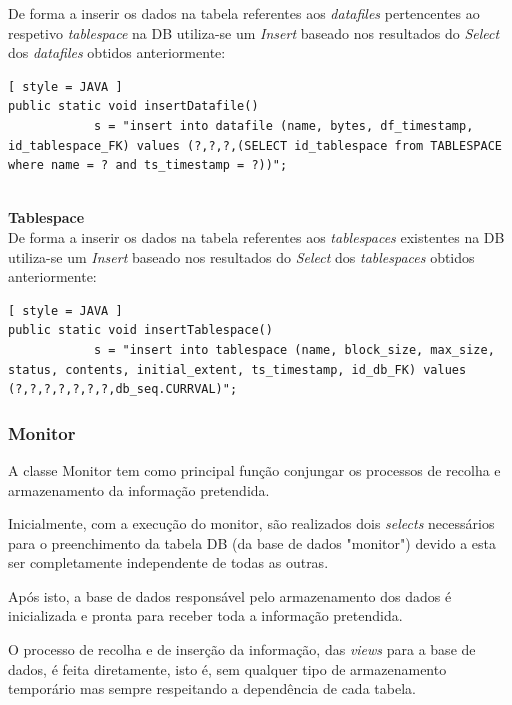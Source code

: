 \documentclass[a4paper]{article}
\begin{document}
De forma a inserir os dados na tabela referentes aos \emph{datafiles} pertencentes ao respetivo \emph{tablespace} na DB utiliza-se um \emph{Insert} baseado nos resultados do \emph{Select} dos \emph{datafiles} obtidos anteriormente:

\begin{lstlisting}[ style = JAVA ]
public static void insertDatafile() 
            s = "insert into datafile (name, bytes, df_timestamp, id_tablespace_FK) values (?,?,?,(SELECT id_tablespace from TABLESPACE where name = ? and ts_timestamp = ?))";


\end{lstlisting}

\textbf{\large Tablespace}\\

De forma a inserir os dados na tabela referentes aos \emph{tablespaces} existentes na DB utiliza-se um \emph{Insert} baseado nos resultados do \emph{Select} dos \emph{tablespaces} obtidos anteriormente:

\begin{lstlisting}[ style = JAVA ]
public static void insertTablespace() 
            s = "insert into tablespace (name, block_size, max_size, status, contents, initial_extent, ts_timestamp, id_db_FK) values (?,?,?,?,?,?,?,db_seq.CURRVAL)";

\end{lstlisting}

\subsubsection{Monitor}
\hspace{3mm} 

A classe Monitor tem como principal função conjungar os processos de recolha e armazenamento da informação pretendida. 

Inicialmente, com a execução do monitor, são realizados dois \emph{selects} necessários para o preenchimento da tabela DB (da base de dados "monitor") devido a esta ser completamente independente de todas as outras.  

Após isto, a base de dados responsável pelo armazenamento dos dados é inicializada e pronta para receber toda a informação pretendida.

O processo de recolha e de inserção da informação, das \emph{views} para a base de dados, é feita diretamente, isto é, sem qualquer tipo de armazenamento temporário mas sempre respeitando a dependência de cada tabela.
\end{document}
